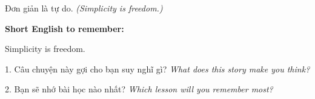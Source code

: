 \begin{baihoc}
Đơn giản là tự do.
\textit{(Simplicity is freedom.)}
\end{baihoc}

\begin{ghinhoanh}
\textbf{Short English to remember:}

Simplicity is freedom.

\end{ghinhoanh}

\begin{tuhocnhanh}
1. Câu chuyện này gợi cho bạn suy nghĩ gì? \textit{What does this story make you think?}

2. Bạn sẽ nhớ bài học nào nhất? \textit{Which lesson will you remember most?}
\end{tuhocnhanh}
\ngancach
